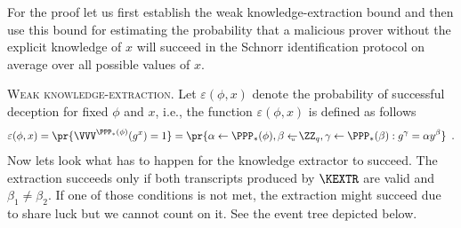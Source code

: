 \documentclass{crypto-exercise}
\begin{document}
\begin{solution}
For the proof let us first establish the weak knowledge-extraction bound and then use this bound for estimating the probability that a malicious prover without the explicit knowledge of $x$ will succeed in the Schnorr identification protocol on average over all possible values of $x$. 

\vspace*{2ex}
\noindent
\textsc{Weak knowledge-extraction.} Let $\varepsilon(\phi,x)$ denote the probability of successful deception for fixed $\phi$ and $x$, i.e., the function $\varepsilon(\phi,x)$ is defined as follows
\begin{align*}
\varepsilon(\phi,x)=\pr{\smash{\VVV^{\PPP_*(\phi)}(g^x)=1}}=\pr{\alpha\gets\PPP_*(\phi),\beta\getsu\ZZ_q, \gamma\gets\PPP_*(\beta): g^\gamma=\alpha y^\beta}\enspace.
\end{align*}
Now lets look what has to happen for the knowledge extractor to succeed. The extraction succeeds only if both transcripts produced by $\KEXTR$ are valid and $\beta_1 \neq \beta_2$. If one of those conditions is not met, the extraction might succeed due to share luck but we cannot count on it. See the event tree depicted below.
 

\end{solution}
\end{document}
